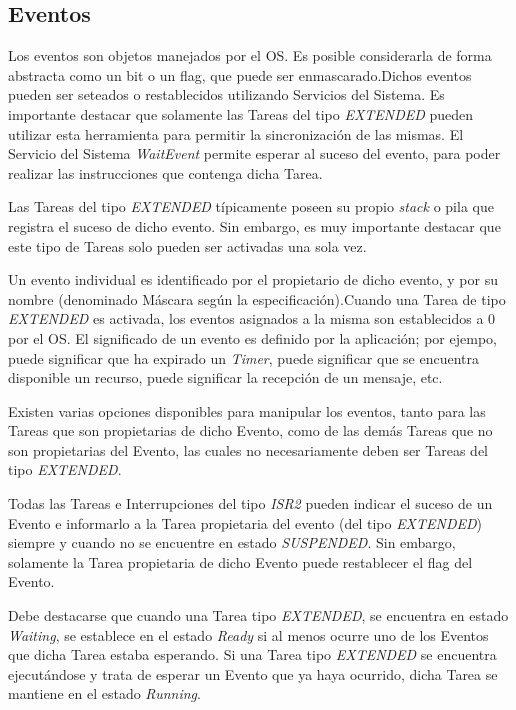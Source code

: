 \documentclass[12pt,letterpaper]{article}
\begin{document}
\subsection{Eventos}

Los eventos son objetos manejados por el OS. Es posible considerarla de forma abstracta como un bit o un flag, que puede ser enmascarado.Dichos eventos pueden ser seteados o restablecidos utilizando Servicios del Sistema. Es importante destacar que solamente las Tareas del tipo \textit{EXTENDED} pueden utilizar esta herramienta para permitir la sincronización de las mismas. El Servicio del Sistema \textit{WaitEvent} permite esperar al suceso del evento, para poder realizar las instrucciones que contenga dicha Tarea.

Las Tareas del tipo \textit{EXTENDED} típicamente poseen su propio \textit{stack} o pila que registra el suceso de dicho evento. Sin embargo, es muy importante destacar que este tipo de Tareas solo pueden ser activadas una sola vez.

Un evento individual es identificado por el propietario de dicho evento, y por su nombre (denominado Máscara según la especificación).Cuando una Tarea de tipo \textit{EXTENDED} es activada, los eventos asignados a la misma son establecidos a 0 por el OS. El significado de un evento es definido por la aplicación; por ejempo, puede significar que ha expirado un \textit{Timer}, puede significar que se encuentra disponible un recurso, puede significar la recepción de un mensaje, etc.

Existen varias opciones disponibles para manipular los eventos, tanto para las Tareas que son propietarias de dicho Evento, como de las demás Tareas que no son propietarias del Evento, las cuales no necesariamente deben ser Tareas del tipo \textit{EXTENDED}.

Todas las Tareas e Interrupciones del tipo \textit{ISR2} pueden indicar el suceso de un Evento e informarlo a la Tarea propietaria del evento (del tipo \textit{EXTENDED}) siempre y cuando no se encuentre en estado \textit{SUSPENDED}. Sin embargo, solamente la Tarea propietaria de dicho Evento puede restablecer el flag del Evento.

Debe destacarse que cuando una Tarea tipo \textit{EXTENDED}, se encuentra en estado \textit{Waiting}, se establece en el estado \textit{Ready} si al menos ocurre uno de los Eventos que dicha Tarea estaba esperando. Si una Tarea tipo \textit{EXTENDED} se encuentra ejecutándose y trata de esperar un Evento que ya haya ocurrido, dicha Tarea se mantiene en el estado \textit{Running}.
\end{document}
